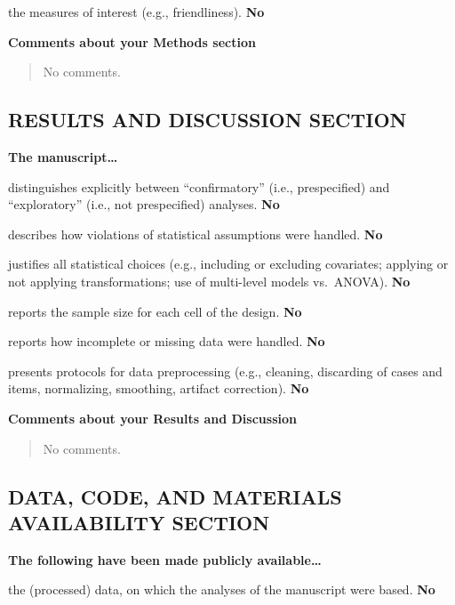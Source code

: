 \documentclass[
  ,
]{article}
\begin{document}
the measures of interest (e.g., friendliness). \hfill  \textbf{No}

\textbf{Comments about your Methods section}

\begin{quote}
No comments.
\end{quote}

\newpage

\hypertarget{results-and-discussion-section}{%
\subsection{RESULTS AND DISCUSSION
SECTION}\label{results-and-discussion-section}}

\textbf{The manuscript\ldots{}}

distinguishes explicitly between ``confirmatory'' (i.e., prespecified)
and ``exploratory'' (i.e., not prespecified) analyses.
\hfill  \textbf{No}

describes how violations of statistical assumptions were handled.
\hfill  \textbf{No}

justifies all statistical choices (e.g., including or excluding
covariates; applying or not applying transformations; use of multi-level
models vs.~ANOVA). \hfill  \textbf{No}

reports the sample size for each cell of the design. \hfill  \textbf{No}

reports how incomplete or missing data were handled. \hfill  \textbf{No}

presents protocols for data preprocessing (e.g., cleaning, discarding of
cases and items, normalizing, smoothing, artifact correction).
\hfill  \textbf{No}

\textbf{Comments about your Results and Discussion}

\begin{quote}
No comments.
\end{quote}

\newpage

\hypertarget{data-code-and-materials-availability-section}{%
\subsection{DATA, CODE, AND MATERIALS AVAILABILITY
SECTION}\label{data-code-and-materials-availability-section}}

\textbf{The following have been made publicly available\ldots{}}

the (processed) data, on which the analyses of the manuscript were
based. \hfill  \textbf{No}
\end{document}
